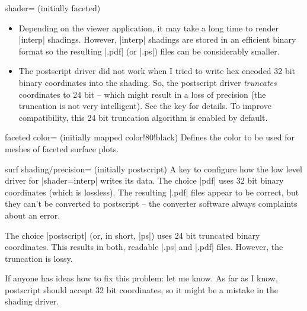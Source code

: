 \begin{pgfplotskey}{shader= (initially faceted)}
\begin{itemize}
		\item Depending on the viewer application, it may take a long time to render |interp| shadings. However, |interp| shadings are stored in an efficient binary format so the resulting |.pdf| (or |.ps|) files can be considerably smaller.

		\item The postscript driver did not work when I tried to write hex encoded 32 bit binary coordinates into the shading. So, the postscript driver \emph{truncates} coordinates to 24 bit -- which might result in a loss of precision (the truncation is not very intelligent). See the  key for details. To improve compatibility, this 24 bit truncation algorithm is enabled by default.
	\end{itemize}

\pgfplotsexpensiveexample
\begin{codeexample}[]
\end{codeexample}

\pgfplotsexpensiveexample
\begin{codeexample}[]
\end{codeexample}
\end{pgfplotskey}

\begin{pgfplotskey}{faceted color= (initially mapped color!80!black)}
	Defines the color to be used for meshes of faceted surface plots.
\end{pgfplotskey}

\begin{pgfplotskey}{surf shading/precision= (initially postscript)}
	A key to configure how the low level driver for |shader=interp| writes its data. The choice |pdf| uses 32 bit binary coordinates (which is lossless). The resulting |.pdf| files appear to be correct, but they can't be converted to postscript -- the converter software always complaints about an error. 

	The choice |postscript| (or, in short, |ps|) uses 24 bit truncated binary coordinates. This results in both, readable |.ps| and |.pdf| files. However, the truncation is lossy.

	If anyone has ideas how to fix this problem: let me know. As far as I know, postscript should accept 32 bit coordinates, so it might be a mistake in the shading driver.
\end{pgfplotskey}

